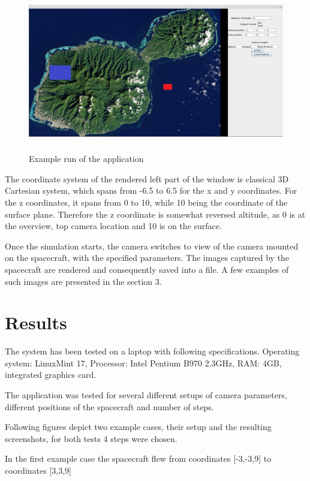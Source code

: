 \documentclass[english,12pt,a4paper,pdftex,elec,utf8]{aaltothesis}
\begin{document}
\begin{figure}[htb]
\centering \includegraphics[height=7cm]{GUIExample.png}
\caption{Example run of the application\label{GUIExample}}
\end{figure}

The coordinate system of the rendered left part of the window is classical 3D Cartesian system, which spans from -6.5 to 6.5 for the x and y coordinates. For the z coordinates, it spans from 0 to 10, while 10 being the coordinate of the surface plane. Therefore the z coordinate is somewhat reversed altitude, as 0 is at the overview, top camera location and 10 is on the surface. 

Once the simulation starts, the camera switches to view of the camera mounted on the spacecraft, with the specified parameters. The images captured by the spacecraft are rendered and consequently saved into a file. A few examples of such images are presented in the section 3.

\clearpage

\section{Results}

The system has been tested on a laptop with following specifications. Operating system: LinuxMint 17, Processor: Intel Pentium B970 2.3GHz, RAM: 4GB, integrated graphics card.

The application was tested for several different setups of camera parameters, different positions of the spacecraft and number of steps. 

Following figures depict two example cases, their setup and the resulting screenshots, for both tests 4 steps were chosen.

In the first example case the spacecraft flew from coordinates [-3,-3,9] to coordinates [3,3,9]
\end{document}
